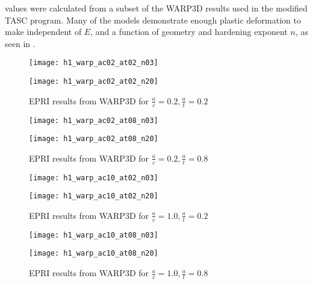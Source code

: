 \hone values were calculated from a subset of the WARP3D results used in the modified TASC program.
Many of the models demonstrate enough plastic deformation to make \hone independent of \(E\), and a function of geometry and hardening exponent \(n\), as seen in .
\begin{figure}[tbp]
\centering
\begin{minipage}{0.45\columnwidth}
\texttt{[image: h1\_warp\_ac02\_at02\_n03]}
\end{minipage}
\begin{minipage}{0.45\columnwidth}
\texttt{[image: h1\_warp\_ac02\_at02\_n20]}
\end{minipage}
\caption{\label{fig:h1_warp_ac02_at02} EPRI \hone results from WARP3D for \(\frac{a}{c}=0.2, \frac{a}{t}=0.2\)}
\end{figure}
\begin{figure}[tbp]
\centering
\begin{minipage}{0.45\columnwidth}
\texttt{[image: h1\_warp\_ac02\_at08\_n03]}
\end{minipage}
\begin{minipage}{0.45\columnwidth}
\texttt{[image: h1\_warp\_ac02\_at08\_n20]}
\end{minipage}
\caption{\label{fig:h1_warp_ac02_at08} EPRI \hone results from WARP3D for \(\frac{a}{c}=0.2, \frac{a}{t}=0.8\)}
\end{figure}
\begin{figure}[tbp]
\centering
\begin{minipage}{0.45\columnwidth}
\texttt{[image: h1\_warp\_ac10\_at02\_n03]}
\end{minipage}
\begin{minipage}{0.45\columnwidth}
\texttt{[image: h1\_warp\_ac10\_at02\_n20]}
\end{minipage}
\caption{\label{fig:h1_warp_ac10_at02} EPRI \hone results from WARP3D for \(\frac{a}{c}=1.0, \frac{a}{t}=0.2\)}
\end{figure}
\begin{figure}[tbp]
\centering
\begin{minipage}{0.45\columnwidth}
\texttt{[image: h1\_warp\_ac10\_at08\_n03]}
\end{minipage}
\begin{minipage}{0.45\columnwidth}
\texttt{[image: h1\_warp\_ac10\_at08\_n20]}
\end{minipage}
\caption{\label{fig:h1_warp_ac10_at08} EPRI \hone results from WARP3D for \(\frac{a}{c}=1.0, \frac{a}{t}=0.8\)}
\end{figure}

